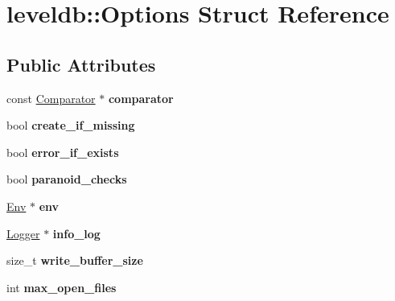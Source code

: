 \hypertarget{structleveldb_1_1_options}{}\section{leveldb\+::Options Struct Reference}
\label{structleveldb_1_1_options}
\subsection*{Public Attributes}
\begin{DoxyCompactItemize}
\item 
\mbox{\label{structleveldb_1_1_options_a7522fbf79de73c4f73ef8d9392e8c80b}} 
const \mbox{\hyperlink{structleveldb_1_1_comparator}{Comparator}} $\ast$ {\bfseries comparator}
\item 
\mbox{\label{structleveldb_1_1_options_afe1b4e94164ff8f081b1c25bf1bcb62e}} 
bool {\bfseries create\+\_\+if\+\_\+missing}
\item 
\mbox{\label{structleveldb_1_1_options_aff3b99b1b30a2dba9642adc6c912d5b7}} 
bool {\bfseries error\+\_\+if\+\_\+exists}
\item 
\mbox{\label{structleveldb_1_1_options_a4263dcc655493100eecc9daf6737a10b}} 
bool {\bfseries paranoid\+\_\+checks}
\item 
\mbox{\label{structleveldb_1_1_options_aeb08bfe820e9c89f57446d6fbd2e6ea8}} 
\mbox{\hyperlink{classleveldb_1_1_env}{Env}} $\ast$ {\bfseries env}
\item 
\mbox{\label{structleveldb_1_1_options_af5545cba00b0e9763ad0279a74acc429}} 
\mbox{\hyperlink{classleveldb_1_1_logger}{Logger}} $\ast$ {\bfseries info\+\_\+log}
\item 
\mbox{\label{structleveldb_1_1_options_a017f1f9558e6b3887434df29a16dac97}} 
size\+\_\+t {\bfseries write\+\_\+buffer\+\_\+size}
\item 
\mbox{\label{structleveldb_1_1_options_a25c6ea125fc63342d8fc25b2f7817be4}} 
int {\bfseries max\+\_\+open\+\_\+files}

\end{DoxyCompactItemize}
